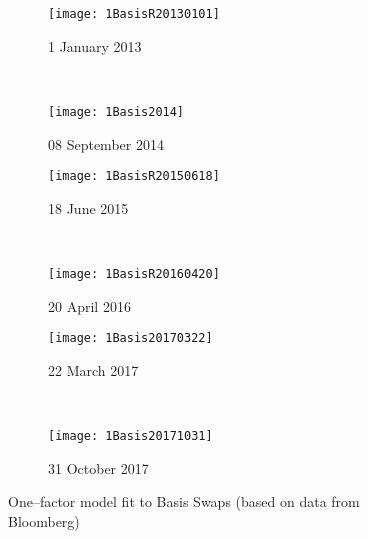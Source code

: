 \documentclass[12pt,a4paper]{article}
\theoremstyle{plain}
\numberwithin{equation}{section}
\begin{document}
\begin{figure}[t]
  \centering
    \begin{subfigure}[b]{0.53\textwidth}
        \texttt{[image: 1BasisR20130101]}
        \caption{1 January 2013}
        \label{fig:ub}
    \end{subfigure}
    ~
    \begin{subfigure}[b]{0.53\textwidth}
        \texttt{[image: 1Basis2014]}
       \caption{08 September 2014}
        \label{figxb}
    \end{subfigure}\vspace*{1em}

     \begin{subfigure}[b]{0.53\textwidth}
        \texttt{[image: 1BasisR20150618]}
       \caption{18 June 2015}
        \label{figxb}
    \end{subfigure}
      ~
    \begin{subfigure}[b]{0.53\textwidth}
        \texttt{[image: 1BasisR20160420]}
       \caption{20 April 2016}
        \label{figxb}
    \end{subfigure}\vspace*{1em}

     \begin{subfigure}[b]{0.53\textwidth}
        \texttt{[image: 1Basis20170322]}
       \caption{22 March 2017}
        \label{figx}
    \end{subfigure}
    ~
     \begin{subfigure}[b]{0.53\textwidth}
        \texttt{[image: 1Basis20171031]}
       \caption{31 October 2017}
        \label{figxa}
    \end{subfigure}\vspace*{1em}

\caption{One--factor model fit to Basis Swaps (based on data from Bloomberg)}\label{basisconstpar1}
\end{figure}
\end{document}
